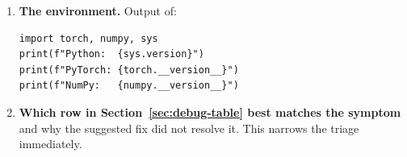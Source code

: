 \begin{enumerate}
  \item \textbf{The environment.}
        Output of:
\begin{lstlisting}[style=grailInStyle]
import torch, numpy, sys
print(f"Python:  {sys.version}")
print(f"PyTorch: {torch.__version__}")
print(f"NumPy:   {numpy.__version__}")
\end{lstlisting}

  \item \textbf{Which row in Section~\ref{sec:debug-table} best matches the symptom}
        and why the suggested fix did not resolve it.
        This narrows the triage immediately.

\end{enumerate}

